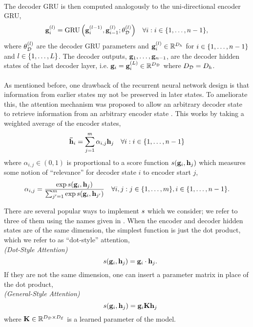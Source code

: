 \paragraph{}
The decoder GRU is then computed analogously to the uni-directional encoder GRU,
\begin{align*}
    \mathbf{g}_i^{(l)} & =\operatorname{GRU}\left(\mathbf{g}_i^{(l - 1)}, \mathbf{g}_{i-1}^{(l)}; \theta_\mathcal{D}^{(l)}\right) & \forall i : i \in \{1,\ldots, n-1\},
\end{align*}
where $\theta_\mathcal{D}^{(l)}$ are the decoder GRU parameters and
$ \mathbf{g}_i^{(l)} \in \mathbb{R}^{D_{h}}$ for $i \in \{1,\ldots,n-1\}$ and $l \in \{1,\ldots,L\}$.
The decoder outputs, $\mathbf{g}_1,\ldots,\mathbf{g}_{n-1}$, are the decoder hidden states of the last decoder layer, i.e. $\mathbf{g}_i = \mathbf{g}^{(L)}_i \in \mathbb{R}^{{D_\mathcal{D}}}$ where ${D_\mathcal{D}}=D_{h}$.

\paragraph{}

As mentioned before, one drawback of the recurrent neural network design is that information
from earlier states my not be preserved in later states. To ameliorate this, the attention
mechanism was proposed to allow an arbitrary decoder state to retrieve information from an arbitrary
encoder state \citep{bahdanau2015}. This works by taking a weighted average of the encoder states,
\begin{align*}
    {\boldsymbol{\bar{\mathbf{h}}}}_i & = \sum^{m}_{j=1}\alpha_{i,j}\mathbf{h}_j & \forall i : i \in \{1,\ldots, n-1\}
\end{align*}
where $\alpha_{i,j} \in (0,1)$ is proportional to a score function $s(\mathbf{g}_i,\mathbf{h}_j)$ which 
measures some notion of ``relevance'' for decoder state $i$ to encoder start $j$,
\[\alpha_{i,j} = \frac{\exp s(\mathbf{g}_i, \mathbf{h}_j) }{ \sum_{j^\prime=1}^{m} \exp s(\mathbf{g}_i, \mathbf{h}_{j^\prime})} \quad \forall i,j : j \in \{1,\ldots,m\}, i \in \{1,\ldots,n-1\}.\]

There are several popular ways to implement $s$ which we consider; we refer to three of them
using the names given in \citet{luong2015}. When the encoder and decoder
hidden states are of the same dimension, the simplest function is just the dot product, which 
we refer to as ``dot-style'' attention,\\
\textit{(Dot-Style Attention)}
\[ \quad s(\mathbf{g}_i,\mathbf{h}_j) = \mathbf{g}_i \cdot \mathbf{h}_j. \]
If they are not the same dimension, one can insert a parameter matrix in place of the dot product,\\
\textit{(General-Style Attention)}
\[ \quad s(\mathbf{g}_i,\mathbf{h}_j) = \mathbf{g}_i \mathbf{K} \mathbf{h}_j \]
where $\mathbf{K} \in \mathbb{R}^{{D_\mathcal{D}} \times {D_\mathcal{E}}}$ is a learned parameter of the model.

